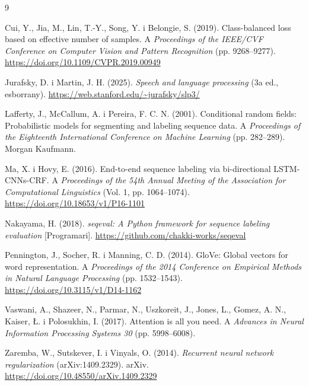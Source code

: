 \begin{thebibliography}{9}
\small

Cui, Y., Jia, M., Lin, T.-Y., Song, Y. i Belongie, S. (2019). Class-balanced loss based on effective number of
samples. A \emph{Proceedings of the IEEE/CVF Conference on Computer Vision and Pattern Recognition} (pp.
9268--9277). \url{https://doi.org/10.1109/CVPR.2019.00949}

Jurafsky, D. i Martin, J. H. (2025). \emph{Speech and language processing} (3a ed., esborrany).
\url{https://web.stanford.edu/~jurafsky/slp3/}

Lafferty, J., McCallum, A. i Pereira, F. C. N. (2001). Conditional random fields: Probabilistic models for
segmenting and labeling sequence data. A \emph{Proceedings of the Eighteenth International Conference on
Machine Learning} (pp. 282--289). Morgan Kaufmann.

Ma, X. i Hovy, E. (2016). End-to-end sequence labeling via bi-directional LSTM-CNNs-CRF. A \emph{Proceedings of
the 54th Annual Meeting of the Association for Computational Linguistics} (Vol. 1, pp. 1064--1074).
\url{https://doi.org/10.18653/v1/P16-1101}

Nakayama, H. (2018). \emph{seqeval: A Python framework for sequence labeling evaluation} [Programari].
\url{https://github.com/chakki-works/seqeval}

Pennington, J., Socher, R. i Manning, C. D. (2014). GloVe: Global vectors for word representation. A
\emph{Proceedings of the 2014 Conference on Empirical Methods in Natural Language Processing} (pp.
1532--1543). \url{https://doi.org/10.3115/v1/D14-1162}

Vaswani, A., Shazeer, N., Parmar, N., Uszkoreit, J., Jones, L., Gomez, A. N., Kaiser, Ł. i Polosukhin, I. (2017).
Attention is all you need. A \emph{Advances in Neural Information Processing Systems 30} (pp. 5998--6008).

Zaremba, W., Sutskever, I. i Vinyals, O. (2014). \emph{Recurrent neural network regularization} (arXiv:1409.2329).
arXiv. \url{https://doi.org/10.48550/arXiv.1409.2329}

\end{thebibliography}
